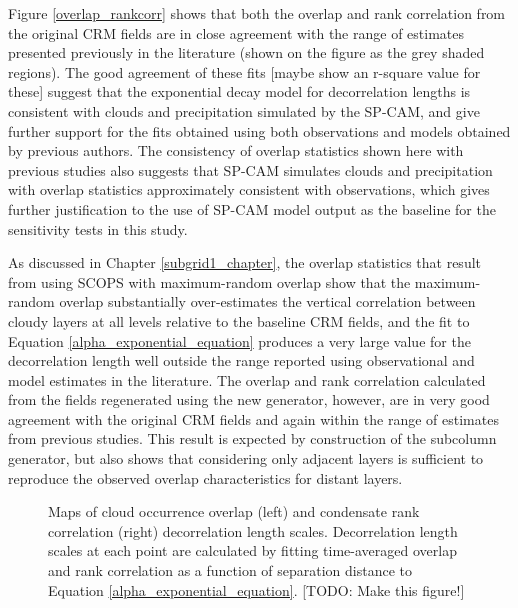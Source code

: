 Figure \ref{overlap_rankcorr} shows that both the overlap and rank correlation from the original CRM fields are in close agreement with the range of estimates presented previously in the literature (shown on the figure as the grey shaded regions). The good agreement of these fits [maybe show an r-square value for these] suggest that the exponential decay model for decorrelation lengths is consistent with clouds and precipitation simulated by the SP-CAM, and give further support for the fits obtained using both observations and models obtained by previous authors. The consistency of overlap statistics shown here with previous studies also suggests that SP-CAM simulates clouds and precipitation with overlap statistics approximately consistent with observations, which gives further justification to the use of SP-CAM model output as the baseline for the sensitivity tests in this study.

As discussed in Chapter \ref{subgrid1_chapter}, the overlap statistics that result from using SCOPS with maximum-random overlap show that the maximum-random overlap substantially over-estimates the vertical correlation between cloudy layers at all levels relative to the baseline CRM fields, and the fit to Equation \ref{alpha_exponential_equation} produces a very large value for the decorrelation length well outside the range reported using observational and model estimates in the literature. The overlap and rank correlation calculated from the fields regenerated using the new generator, however, are in very good agreement with the original CRM fields and again within the range of estimates from previous studies. This result is expected by construction of the subcolumn generator, but also shows that considering only adjacent layers is sufficient to reproduce the observed overlap characteristics for distant layers.

\begin{figure}
\centering
\caption{Maps of cloud occurrence overlap (left) and condensate rank correlation (right) decorrelation length scales. Decorrelation length scales at each point are calculated by fitting time-averaged overlap and rank correlation as a function of separation distance to Equation \ref{alpha_exponential_equation}. [TODO: Make this figure!]}
\label{sgi_overlap_map}
\end{figure}

